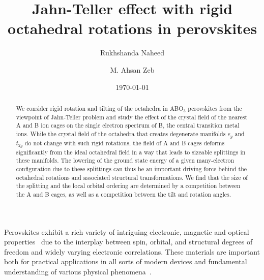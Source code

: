 \documentclass[a4paper,prb,twocolumn]{revtex4-1}  %
\begin{document}
\title{Jahn-Teller effect with rigid octahedral rotations in perovskites} %


\author{Rukhshanda Naheed}

\author{M. Ahsan Zeb}

\date{\today}
\begin{abstract}

We consider
rigid rotation and tilting of the 
octahedra
 in ABO$_3$ perovskites
 from the viewpoint of Jahn-Teller problem
 and study the
effect of the crystal field of the nearest A and B ion cages 
on the single electron spectrum of B, the 
central 
transition metal ions.
While the crystal field of the octahedra 
that 
creates degenerate manifolds $e_g$ and $t_{2g}$ 
do not change with such rigid rotations, 
the field of 
A and B cages
deforms significantly %
from the ideal octahedral field
in a way that
leads to sizeable splittings in 
these manifolds.
The lowering of the ground state energy
of a given many-electron configuration
due to these splittings
can thus be an important driving force behind the octahedral rotations 
and associated structural transformations.
We find that the size of the splitting and the local orbital ordering are
determined by a competition between the A and B cages, 
as well as a competition between the tilt and rotation angles.

\end{abstract}
\maketitle


Perovskites  
exhibit a rich variety of intriguing 
electronic,
magnetic
 and optical
properties~\cite{ZubkoARCMP11,
HwangNM12, 
BhattacharyaARMR14,
HellmanRMP17,
ChenJPCM17,DagottoS05,DagottoMRSB08}
due to the interplay between
spin, orbital, and structural degrees of 
freedom
and widely varying electronic 
correlations.
These materials 
are important
both for practical applications in all sorts of modern devices 
and 
fundamental understanding of various physical 
phenomena~\cite{SalamonRMP01,
WangS03,
DawberRMP05,
SchlomARMR07,
KosterRMP12}.
\end{document}

